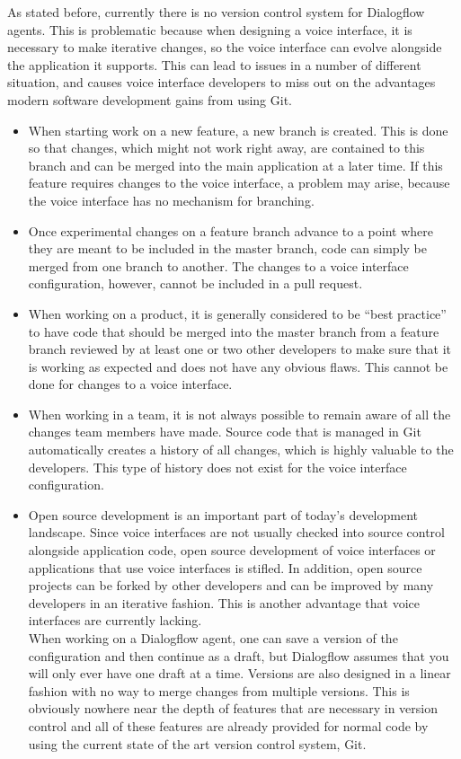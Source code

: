 As stated before, currently there is no version control system for Dialogflow agents.
This is problematic because when designing a voice interface, it is necessary to make iterative changes, so the voice interface can evolve alongside the application it supports. This can lead to issues in a number of different situation, and causes voice interface developers to miss out on the advantages modern software development gains from using Git.
\begin{itemize}
    \item When starting work on a new feature, a new branch is created. This is done so that changes, which might not work right away, are contained to this branch and can be merged into the main application at a later time. If this feature requires changes to the voice interface, a problem may arise, because the voice interface has no mechanism for branching.
    \item Once experimental changes on a feature branch advance to a point where they are meant to be included in the master branch, code can simply be merged from one branch to another. The changes to a voice interface configuration, however, cannot be included in a pull request.
    \item When working on a product, it is generally considered to be “best practice” to have code that should be merged into the master branch from a feature branch reviewed by at least one or two other developers to make sure that it is working as expected and does not have any obvious flaws. This cannot be done for changes to a voice interface.
    \item When working in a team, it is not always possible to remain aware of all the changes team members have made. Source code that is managed in Git automatically creates a history of all changes, which is highly valuable to the developers. This type of history does not exist for the voice interface configuration.
    \item Open source development is an important part of today's development landscape. Since voice interfaces are not usually checked into source control alongside application code, open source development of voice interfaces or applications that use voice interfaces is stifled. In addition, open source projects can be forked by other developers and can be improved by many developers in an iterative fashion. This is another advantage that voice interfaces are currently lacking. \\
    When working on a Dialogflow agent, one can save a version of the configuration and then continue as a draft, but Dialogflow assumes that you will only ever have one draft at a time. Versions are also designed in a linear fashion with no way to merge changes from multiple versions. This is obviously nowhere near the depth of features that are necessary in version control and all of these features are already provided for normal code by using the current state of the art version control system, Git.
\end{itemize}

